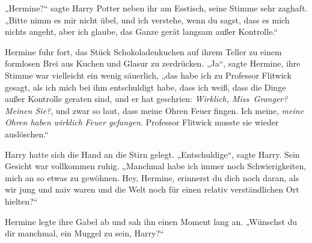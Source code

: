 „Hermine?“ sagte Harry Potter neben ihr am Esstisch, seine Stimme sehr zaghaft. „Bitte nimm es mir nicht übel, und ich verstehe, wenn du sagst, dass es mich nichts angeht, aber ich glaube, das Ganze gerät langsam außer Kontrolle.“

Hermine fuhr fort, das Stück Schokoladenkuchen auf ihrem Teller zu einem formlosen Brei aus Kuchen und Glasur zu zerdrücken. „Ja“, sagte Hermine, ihre Stimme war vielleicht ein wenig säuerlich, „das habe ich zu Professor Flitwick gesagt, als ich mich bei ihm entschuldigt habe, dass ich weiß, dass die Dinge außer Kontrolle geraten sind, und er hat geschrien: \emph{Wirklich, Miss~Granger? Meinen Sie?}, und zwar so laut, dass meine Ohren Feuer fingen. Ich meine, \emph{meine Ohren haben} \emph{wirklich} \emph{Feuer gefangen}. Professor Flitwick musste sie wieder auslöschen.“

Harry hatte sich die Hand an die Stirn gelegt. „Entschuldige“, sagte Harry. Sein Gesicht war vollkommen ruhig. „Manchmal habe ich immer noch Schwierigkeiten, mich an so etwas zu gewöhnen. Hey, Hermine, erinnerst du dich noch daran, als wir jung und naiv waren und die Welt noch für einen relativ verständlichen Ort hielten?“

Hermine legte ihre Gabel ab und sah ihn einen Moment lang an. „Wünschst du dir manchmal, ein Muggel zu sein, Harry?“

